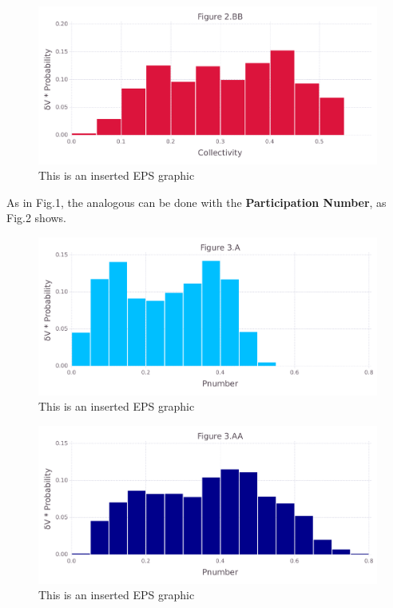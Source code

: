 \documentclass[10pt,letterpaper]{article}
\begin{document}
\begin{figure}[ht]
\begin{center}
\includegraphics[scale=0.5]{1prn/2bbfigure_very_hi-precision.pdf}
\caption{This is an inserted EPS graphic}
\label{fig6}
\end{center}
\end{figure}

\clearpage
As in Fig.1, the analogous can be done with the \textbf{Participation Number}, as Fig.2 shows.

\begin{figure}[ht]
\begin{center}
\includegraphics[scale=0.5]{1prn/3afigure_very_hi-precision.pdf}
\caption{This is an inserted EPS graphic}
\label{fig7}
\end{center}
\end{figure}

\begin{figure}[ht]
\begin{center}
\includegraphics[scale=0.5]{1prn/3aafigure_very_hi-precision.pdf}
\caption{This is an inserted EPS graphic}
\label{fig8}
\end{center}
\end{figure}
\end{document}
